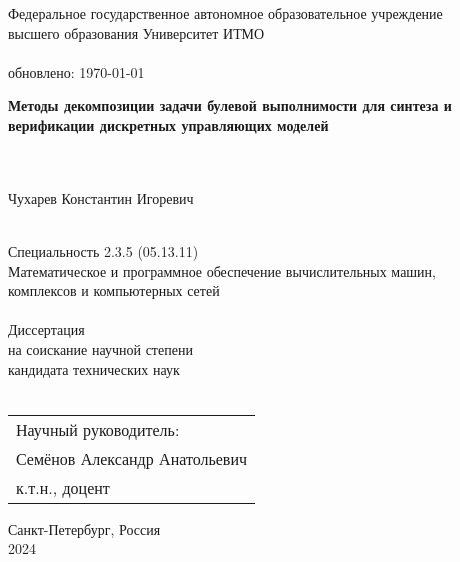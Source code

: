 \thispagestyle{empty}


\begin{center}
	Федеральное государственное автономное образовательное учреждение \\ высшего образования Университет ИТМО \\ \ \\
	{\tiny обновлено: \today}
\end{center}

\vspace{0pt plus2fill}

\begin{center}
\textbf{\large %
Методы декомпозиции задачи булевой выполнимости для синтеза и верификации дискретных управляющих моделей
} \\ \ \\ \

{\large
Чухарев Константин Игоревич
}
\\ \

{Специальность 2.3.5 (05.13.11)} \\
{\small Математическое и программное обеспечение вычислительных машин, \\ комплексов и компьютерных сетей} \\ \ \\
Диссертация \\ на соискание научной степени \\ кандидата технических наук \\ \ \\
\hfill\begin{tabular}{l}
Научный руководитель: \\
Семёнов Александр Анатольевич \\
к.т.н., доцент
\end{tabular}
\end{center}

\vspace{0pt plus2fill}

\begin{center}
	Санкт-Петербург, Россия\\
	2024
\end{center}

